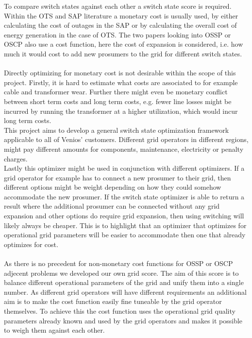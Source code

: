 To compare switch states against each other a switch state score is required. 
Within the OTS and SAP literature a monetary cost is usually used, by either
calculating the cost of outages in the SAP\autocite{switch_allociation_lit_review} or by calculating the overall cost
of energy generation in the case of OTS\autocite{ots_lit_review}. The two papers
looking into OSSP or OSCP also use a cost function, here the cost of expansion
is considered, i.e. how much it would cost to add new prosumers to the grid
for different switch states.\\
\\
Directly optimizing for monetary cost is not desirable within the scope of this
project. Firstly, it is hard to estimate what costs are associated
to for example cable and transformer wear. Further there might even
be monetary conflict between short term costs and long term costs, e.g.
fewer line losses might be incurred by running the transformer at
a higher utilization, which would incur long term costs. \\
This project aims to develop a general switch state optimization
framework
applicable to all of Venios' customers. Different grid operators
in different regions, might pay different amounts for components, maintenance, electricity
or penalty charges.\\
Lastly this optimizer might be used in conjunction with different optimizers.
If a grid operator for example has to connect a new prosumer to their grid,
then different options might be weight depending on how they could somehow
accommodate the new prosumer. If the switch state optimizer is able
to return a result where the additional prosumer can be connected without
any grid expansion and other options do require grid expansion, then
using switching will likely always be cheaper\autocite{venios}. 
This is to highlight that an optimizer that optimizes for operational
grid parameters will be easier to accommodate then one that already optimizes
for cost.\\
\\
As there is no precedent for non-monetary cost functions for OSSP or OSCP adjecent
problems we developed our own grid score. The aim of this score
is to balance different operational parameters of the grid and unify them into a single number.
As different grid operators will have different requirements an additional aim
is to make the cost function easily fine tuneable by the grid operator themselves.
To achieve this the cost
function uses the operational grid quality parameters already known and
used by the grid operators and makes it possible to weigh them against each other.\\

